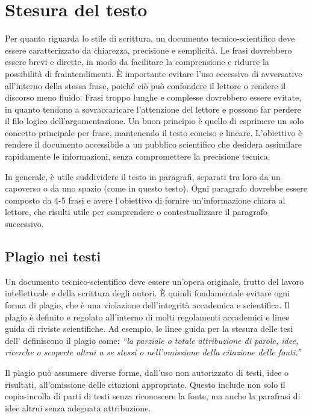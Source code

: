 \documentclass[9pt,a4paper,twoside]{rho-class/rho}
\begin{document}
\section{Stesura del testo}
Per quanto riguarda lo stile di scrittura, un documento tecnico-scientifico deve essere caratterizzato da chiarezza, precisione e semplicità. Le frasi dovrebbero essere brevi e dirette, in modo da facilitare la comprensione e ridurre la possibilità di fraintendimenti. È importante evitare l’uso eccessivo di avversative all’interno della stessa frase, poiché ciò può confondere il lettore o rendere il discorso meno fluido. Frasi troppo lunghe e complesse dovrebbero essere evitate, in quanto tendono a sovraccaricare l’attenzione del lettore e possono far perdere il filo logico dell’argomentazione. Un buon principio è quello di esprimere un solo concetto principale per frase, mantenendo il testo conciso e lineare. L’obiettivo è rendere il documento accessibile a un pubblico scientifico che desidera assimilare rapidamente le informazioni, senza compromettere la precisione tecnica.

In generale, è utile suddividere il testo in paragrafi, separati tra loro da un capoverso o da uno spazio (come in questo testo). Ogni paragrafo dovrebbe essere composto da 4-5 frasi e avere l’obiettivo di fornire un’informazione chiara al lettore, che risulti utile per comprendere o contestualizzare il paragrafo successivo.

\subsection{Plagio nei testi}
Un documento tecnico-scientifico deve essere un’opera originale, frutto del lavoro intellettuale e della scrittura degli autori. È quindi fondamentale evitare ogni forma di plagio, che è una violazione dell’integrità accademica e scientifica. Il plagio è definito e regolato all’interno di molti regolamenti accademici e linee guida di riviste scientifiche. Ad esempio, le linee guida per la stesura delle tesi dell’ \textcite{plagio} definiscono il plagio come: \textit{“la parziale o totale attribuzione di parole, idee, ricerche o scoperte altrui a se stessi o nell’omissione della citazione delle fonti.”}

Il plagio può assumere diverse forme, dall’uso non autorizzato di testi, idee o risultati, all’omissione delle citazioni appropriate. Questo include non solo il copia-incolla di parti di testi senza riconoscere la fonte, ma anche la parafrasi di idee altrui senza adeguata attribuzione.
\end{document}
